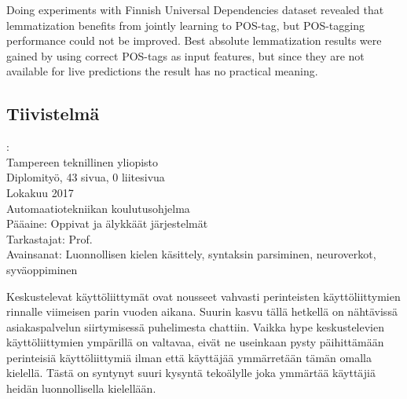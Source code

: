 \documentclass[12pt,a4paper,english
]{tutthesis}
\begin{document}
Doing experiments with Finnish Universal Dependencies dataset revealed that lemmatization benefits from jointly learning to POS-tag, but POS-tagging performance could not be improved. Best absolute lemmatization results were gained by using correct POS-tags as input features, but since they are not available for live predictions the result has no practical meaning.

 



\begin{otherlanguage}{finnish} %
\chapter*{Tiivistelmä} %

\begin{spacing}{1.0}
         {\bf \textsf{\MakeUppercase{\@author}}}: \@titleB\\  %
         \textsf{Tampereen teknillinen yliopisto}\\
         \textsf{Diplomityö, 43 sivua, 0 liitesivua}\\ %
         \textsf{Lokakuu 2017}\\
         \textsf{Automaatiotekniikan koulutusohjelma}\\
         \textsf{Pääaine: Oppivat ja älykkäät järjestelmät}\\
         \textsf{Tarkastajat: Prof. \@examiner}\\ %
         \textsf{Avainsanat: Luonnollisen kielen käsittely, syntaksin parsiminen, neuroverkot, syväoppiminen}\\
\end{spacing}

Keskustelevat käyttöliittymät ovat nousseet vahvasti perinteisten käyttöliittymien rinnalle viimeisen parin vuoden aikana. Suurin kasvu tällä hetkellä on nähtävissä asiakaspalvelun siirtymisessä puhelimesta chattiin. Vaikka hype keskustelevien käyttöliittymien ympärillä on valtavaa, eivät ne useinkaan pysty päihittämään perinteisiä käyttöliittymiä ilman että käyttäjää ymmärretään tämän omalla kielellä. Tästä on syntynyt suuri kysyntä tekoälylle joka ymmärtää käyttäjiä heidän luonnollisella kielellään.


\end{otherlanguage}
\end{document}
